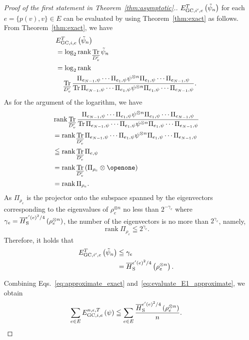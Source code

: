 \documentclass[preprintnumbers,aps,amsmath,amssymb,pra,twocolumn,showpacs,superscriptaddress,floatfix]{revtex4-1}
\DeclareMathOperator{\rank}{rank}
\DeclareMathOperator{\tr}{Tr}
\theoremstyle{plain}
\theoremstyle{definition}
\theoremstyle{remark}
\begin{document}
\begin{proof}[Proof of the first statement in Theorem~\ref{thm:asymptotic}.]
$E_{\textup{GC},i',e}^T\left(\tilde\psi_n\right)$ for each $e=\{p(v),v\} \in E$ can be evaluated by using Theorem~\ref{thm:exact} as follows.  From Theorem~\ref{thm:exact}, we have
\[
    \begin{split}
        &E_{\textup{GC},i,e}^T\left(\tilde\psi_n\right)\\
        &=\log_2\rank\tr_{\overline{D'_v}}\tilde\psi_n\\
        &=\log_2 \rank\\
        &\quad\tr_{\overline{D'_v}}\frac{\Pi_{e_{N-1},\psi}\cdots\Pi_{e_1,\psi}\psi^{\otimes n}\Pi_{e_1,\psi}\cdots\Pi_{e_{N-1},\psi}}{\tr\Pi_{e_{N-1},\psi}\cdots\Pi_{e_1,\psi}\psi^{\otimes n}\Pi_{e_1,\psi}\cdots\Pi_{e_{N-1},\psi}}.\\
    \end{split}
\]
As for the argument of the logarithm,
we have
\[
    \begin{split}
        &\rank\tr_{\overline{D'_v}}\frac{\Pi_{e_{N-1},\psi}\cdots\Pi_{e_1,\psi}\psi^{\otimes n}\Pi_{e_1,\psi}\cdots\Pi_{e_{N-1},\psi}}{\tr\Pi_{e_{N-1},\psi}\cdots\Pi_{e_1,\psi}\psi^{\otimes n}\Pi_{e_1,\psi}\cdots\Pi_{e_{N-1},\psi}}\\
        &=\rank\tr_{\overline{D'_v}}\Pi_{e_{N-1},\psi}\cdots\Pi_{e_1,\psi}\psi^{\otimes n}\Pi_{e_1,\psi}\cdots\Pi_{e_{N-1},\psi}\\
        &\leqq\rank\tr_{\overline{D'_v}}\Pi_{e,\psi}\\
        &=\rank\tr_{\overline{D'_v}}\left(\Pi_{\rho_e}\otimes\openone\right)\\
        &= \rank \Pi_{\rho_{e}}.
    \end{split}
\]
As $\Pi_{\rho_e}$ is the projector onto the subspace spanned by the eigenvectors corresponding to the eigenvalues of $\rho_e^{\otimes n}$ no less than $2^{-\gamma_e}$ where $\gamma_e=\overline{H}_{\textup{S}}^{{\epsilon'(e)}^2/4}\left(\rho_e^{\otimes n}\right)$, the number of the eigenvectors is no more than $2^{\gamma_e}$, namely,
\[
    \rank\Pi_{\rho_e}\leqq 2^{\gamma_e}.
\]
Therefore, it holds that
\begin{equation}
    \label{eq:evaluate_E1_approximate}
    \begin{split}
        E_{\textup{GC},i',e}^T\left(\tilde\psi_n\right)&\leqq\gamma_e\\
        &=\overline{H}_{\textup{S}}^{{\epsilon'(e)}^2/4}\left(\rho_e^{\otimes n}\right).
\end{split}
\end{equation}

Combining Eqs.~\eqref{eq:approximate_exact} and~\eqref{eq:evaluate_E1_approximate}, we obtain
\[
    \sum_{e\in E}E_{\textup{GC},i,e}^{n,\epsilon,T}\left(\psi\right) \leqq \sum_{e\in E}\frac{\overline{H}_{\textup{S}}^{{\epsilon'(e)}^2/4}\left(\rho_e^{\otimes n}\right)}{n}.
\]
\end{proof}
\end{document}
